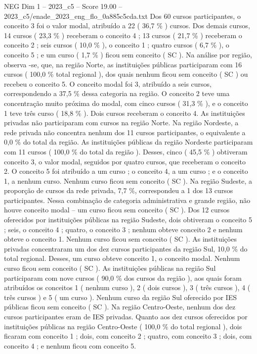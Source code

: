 \begin{textsample}{NEG Dim 1 – 2023\_c5 – Score 19.00 – 2023\_c5/enade\_2023\_eng\_flo\_0a885c5cda.txt}
Dos 60 cursos participantes, o conceito 3 foi o valor modal, atribuído a 22 ( 36,7 \% ) cursos.
Dos demais cursos, 14 cursos ( 23,3 \% ) receberam o conceito 4 ; 13 cursos ( 21,7 \% ) receberam o conceito 2 ; seis cursos ( 10,0 \% ), o conceito 1 ; quatro cursos ( 6,7 \% ), o conceito 5 ; e um curso ( 1,7 \% ) ficou sem conceito ( SC ).
Na análise por região, observa -se, que, na região Norte, as instituições públicas participaram com 16 cursos ( 100,0 \% total regional ), dos quais nenhum ficou sem conceito ( SC ) ou recebeu o conceito 5.
O conceito modal foi 3, atribuído a seis cursos, correspondendo a 37,5 \% dessa categoria na região.
O conceito 2 teve uma concentração muito próxima do modal, com cinco cursos ( 31,3 \% ), e o conceito 1 teve três curso ( 18,8 \% ).
Dois cursos receberam o conceito 4.
As instituições privadas não participaram com cursos na região Norte.
Na região Nordeste, a rede privada não concentra nenhum dos 11 cursos participantes, o equivalente a 0,0 \% do total da região.
As instituições públicas da região Nordeste participaram com 11 cursos ( 100,0 \% do total da região ).
Desses, cinco ( 45,5 \% ) obtiveram conceito 3, o valor modal, seguidos por quatro cursos, que receberam o conceito 2.
O conceito 5 foi atribuído a um curso ; o conceito 4, a um curso ; e o conceito 1, a nenhum curso.
Nenhum curso ficou sem conceito ( SC ).
Na região Sudeste, a proporção de cursos da rede privada, 7,7 \%, correspondeu a 1 dos 13 cursos participantes.
Nessa combinação de categoria administrativa e grande região, não houve conceito modal – um curso ficou sem conceito ( SC ).
Dos 12 cursos oferecidos por instituições públicas na região Sudeste, dois obtiveram o conceito 5 ; seis, o conceito 4 ; quatro, o conceito 3 ; nenhum obteve conceito 2 e nenhum obteve o conceito 1.
Nenhum curso ficou sem conceito ( SC ).
As instituições privadas concentraram um dos dez cursos participantes da região Sul, 10,0 \% do total regional.
Desses, um curso obteve conceito 1, o conceito modal.
Nenhum curso ficou sem conceito ( SC ).
As instituições públicas na região Sul participaram com nove cursos ( 90,0 \% dos cursos da região ), aos quais foram atribuídos os conceitos 1 ( nenhum curso ), 2 ( dois cursos ), 3 ( três cursos ), 4 ( três cursos ) e 5 ( um curso ).
Nenhum curso da região Sul oferecido por IES públicas ficou sem conceito ( SC ).
Na região Centro-Oeste, nenhum dos dez cursos participantes eram de IES privadas.
Quanto aos dez cursos oferecidos por instituições públicas na região Centro-Oeste ( 100,0 \% do total regional ), dois ficaram com conceito 1 ; dois, com conceito 2 ; quatro, com conceito 3 ; dois, com conceito 4 ; e nenhum ficou com conceito 5.

\end{textsample}
